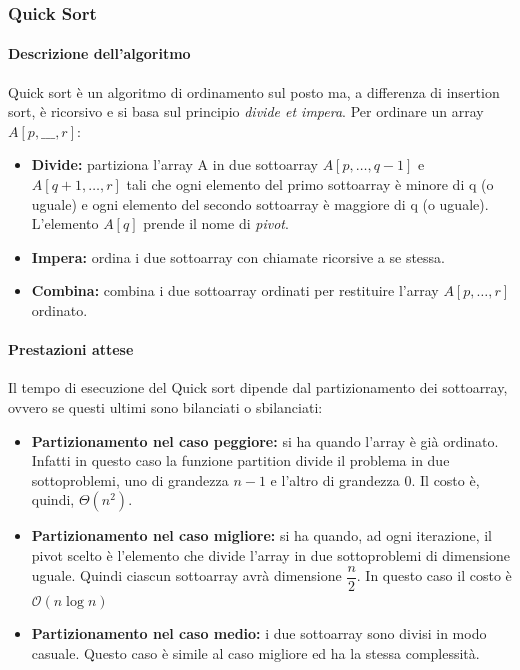 \documentclass[
]{article}
\begin{document}
\hypertarget{quick-sort}{%
\subsubsection{Quick Sort}\label{quick-sort}}

\hypertarget{descrizione-dellalgoritmo-1}{%
\paragraph{Descrizione
dell'algoritmo}\label{descrizione-dellalgoritmo-1}}

Quick sort è un algoritmo di ordinamento sul posto ma, a differenza di
insertion sort, è ricorsivo e si basa sul principio \emph{divide et
impera}. Per ordinare un array \(A[p,\_\_\_, r]\):

\begin{itemize}
\item
  \textbf{Divide:} partiziona l'array A in due sottoarray
  \(A[p,\dotsc, q-1]\) e \(A[q+1,\dotsc, r]\) tali che ogni elemento del
  primo sottoarray è minore di q (o uguale) e ogni elemento del secondo
  sottoarray è maggiore di q (o uguale). L'elemento \(A[q]\) prende il
  nome di \emph{pivot}.
\item
  \textbf{Impera:} ordina i due sottoarray con chiamate ricorsive a se
  stessa.
\item
  \textbf{Combina:} combina i due sottoarray ordinati per restituire
  l'array \(A[p,\dotsc, r]\) ordinato.
\end{itemize}

\hypertarget{prestazioni-attese-1}{%
\paragraph{Prestazioni attese}\label{prestazioni-attese-1}}

Il tempo di esecuzione del Quick sort dipende dal partizionamento dei
sottoarray, ovvero se questi ultimi sono bilanciati o sbilanciati:

\begin{itemize}
\item
  \textbf{Partizionamento nel caso peggiore:} si ha quando l'array è già
  ordinato. Infatti in questo caso la funzione partition divide il
  problema in due sottoproblemi, uno di grandezza \(n - 1\) e l'altro di
  grandezza \(0\). Il costo è, quindi, \(\Theta(n^{2})\).
\item
  \textbf{Partizionamento nel caso migliore:} si ha quando, ad ogni
  iterazione, il pivot scelto è l'elemento che divide l'array in due
  sottoproblemi di dimensione uguale. Quindi ciascun sottoarray avrà
  dimensione \(\dfrac{n}{2}\). In questo caso il costo è
  \(\mathcal{O}(n\log{}n)\)
\item
  \textbf{Partizionamento nel caso medio:} i due sottoarray sono divisi
  in modo casuale. Questo caso è simile al caso migliore ed ha la stessa
  complessità.
\end{itemize}
\end{document}
